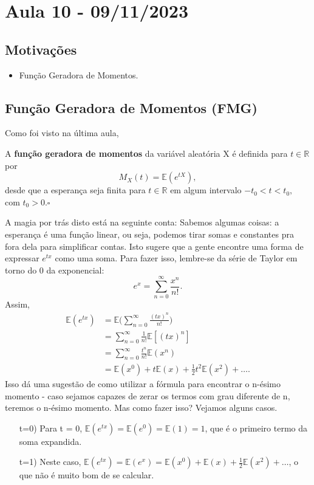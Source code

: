 \documentclass[./probability_notes.tex]{subfiles}
\begin{document}
\section{Aula 10 - 09/11/2023}
\subsection{Motivações}
\begin{itemize}
  \item Função Geradora de Momentos.
\end{itemize}
\subsection{Função Geradora de Momentos (FMG)}
Como foi visto na última aula, 
\begin{def*}
  A \textbf{função geradora de momentos} da variável aleatória X é definida para \(t\in \mathbb{R}\) por 
  \[
    M_{X}(t) = \mathbb{E}(e^{tX}),
  \]
  desde que a esperança seja finita para \(t\in \mathbb{R}\) em algum intervalo \(-t_{0} < t < t_{0},\) com \(t_{0} > 0.\square\)
\end{def*}
A magia por trás disto está na seguinte conta: 
Sabemos algumas coisas: a esperança é uma função linear, ou seja, podemos tirar somas e constantes pra fora dela para simplificar contas.
Isto sugere que a gente encontre uma forma de expressar \(e^{tx}\) como uma soma. Para fazer isso, lembre-se da série de Taylor em torno do 0 da exponencial:
\[
  e^{x} = \sum\limits_{n=0}^{\infty}\frac{x^{n}}{n!}.
\]
Assim, 
\begin{align*}
  \mathbb{E}(e^{tx}) &= \mathbb{E}\biggl(\sum\limits_{n=0}^{\infty}\frac{(tx)^{n}}{n!}\biggr)\\
                     &= \sum\limits_{n=0}^{\infty}\frac{1}{n!}\mathbb{E}[(tx)^{n}]\\
                     &= \sum\limits_{n=0}^{\infty}\frac{t^{n}}{n!}\mathbb{E}(x^{n})\\
                     &= \mathbb{E}(x^{0}) + t \mathbb{E}(x) + \frac{1}{2}t^{2} \mathbb{E}(x^{2}) + \dotsc.
\end{align*}
Isso dá uma sugestão de como utilizar a fórmula para encontrar o n-ésimo momento - caso sejamos capazes de zerar os termos com grau diferente de n,
teremos o n-ésimo momento. Mas como fazer isso? Vejamos alguns casos.
\begin{itemize}
  \item[t=0)] Para t = 0, \(\mathbb{E}(e^{tx}) = \mathbb{E}(e^{0}) = \mathbb{E}(1) = 1\), que é o primeiro termo da soma expandida.
  \item[t=1)] Neste caso, \(\mathbb{E}(e^{tx}) = \mathbb{E}(e^{x}) = \mathbb{E}(x^{0}) + \mathbb{E}(x) + \frac{1}{2}\mathbb{E}(x^{2}) + \dotsc\), o que não
    é muito bom de se calcular. 
\end{itemize}
\end{document}
